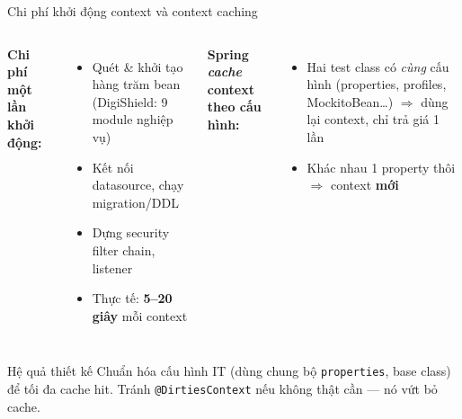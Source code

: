 \documentclass[aspectratio=169,12pt]{beamer}
\begin{document}
\begin{frame}{Chi phí khởi động context và context caching}
  \begin{columns}[t]
    \textbf{Chi phí một lần khởi động:}
    \begin{itemize}\small
      \item Quét \& khởi tạo hàng trăm bean (DigiShield: 9 module nghiệp vụ)
      \item Kết nối datasource, chạy migration/DDL
      \item Dựng security filter chain, listener
      \item Thực tế: \textbf{5--20 giây} mỗi context
    \end{itemize}
    \textbf{Spring \emph{cache} context theo cấu hình:}
    \begin{itemize}\small
      \item Hai test class có \emph{cùng} cấu hình (properties, profiles,
        MockitoBean\ldots) $\Rightarrow$ dùng lại context, chỉ trả giá 1 lần
      \item Khác nhau 1 property thôi $\Rightarrow$ context \textbf{mới}
    \end{itemize}
  \end{columns}
  \vspace{0.3em}
  \begin{alertblock}{Hệ quả thiết kế}
    Chuẩn hóa cấu hình IT (dùng chung bộ \texttt{properties}, base class) để
    tối đa cache hit. Tránh \texttt{@DirtiesContext} nếu không thật cần ---
    nó vứt bỏ cache.
  \end{alertblock}
\end{frame}
\end{document}

